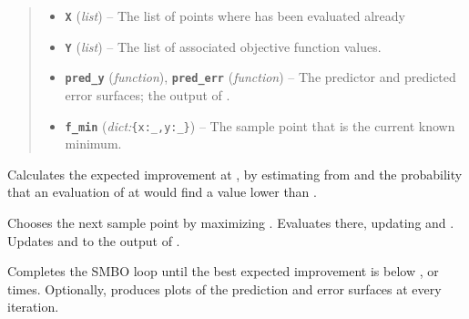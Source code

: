 \begin{fulllineitems}
\begin{quote}
\begin{description}
\begin{itemize}
\item{}
\textbf{\texttt{X}} (\emph{list}) -- The list of points where  has been evaluated already

\item {} 
\textbf{\texttt{Y}} (\emph{list}) -- The list of associated objective function values.

\item {} 
\textbf{\texttt{pred\_y}} (\emph{function}), \textbf{\texttt{pred\_err}} (\emph{function}) -- The predictor and predicted error surfaces; the output of .

\item {} 
\textbf{\texttt{f\_min}} (\emph{dict:}\texttt{\{x:\_,y:\_\}}) -- The sample point that is the current known minimum.


\end{itemize}


\end{description}\end{quote}


\begin{fulllineitems}
\label{index:smbo.smb_optimizer.smb_optimizer.exp_improvement}Calculates the expected improvement at , by estimating from  and  the probability that an evaluation of  at  would find a value lower than .


\end{fulllineitems}


\begin{fulllineitems}
\label{index:smbo.smb_optimizer.smb_optimizer.sample}
Chooses the next sample point by maximizing .
Evaluates  there, updating  and . Updates  and  to the output of .
\end{fulllineitems}


\begin{fulllineitems}
\label{index:smbo.smb_optimizer.smb_optimizer.take_samples}
Completes the SMBO loop until the best expected improvement is below , or  times. Optionally, produces plots of the prediction and error surfaces at every iteration.
\end{fulllineitems}






\end{fulllineitems}


